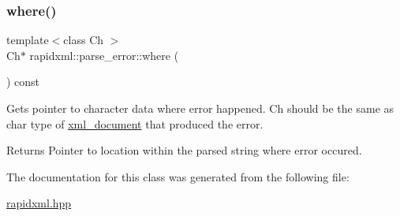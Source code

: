 \subsubsection{\texorpdfstring{where()}{where()}}
{\footnotesize\ttfamily template$<$class Ch $>$ \\
Ch$\ast$ rapidxml\+::parse\+\_\+error\+::where (\begin{DoxyParamCaption}{ }\end{DoxyParamCaption}) const\hspace{0.3cm}{\ttfamily [inline]}}

Gets pointer to character data where error happened. Ch should be the same as char type of \mbox{\hyperlink{classrapidxml_1_1xml__document}{xml\+\_\+document}} that produced the error. \begin{DoxyReturn}{Returns}
Pointer to location within the parsed string where error occured. 
\end{DoxyReturn}


The documentation for this class was generated from the following file\+:\begin{DoxyCompactItemize}
\item 
\mbox{\hyperlink{rapidxml_8hpp}{rapidxml.\+hpp}}\end{DoxyCompactItemize}
